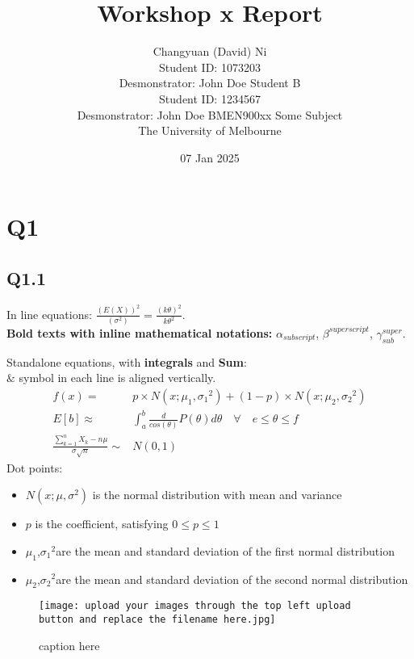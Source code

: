 \documentclass[a4paper,11pt]{article}
\title{Workshop x Report}
\author{\large
Changyuan (David) Ni\\
Student ID: 1073203\\
Desmonstrator: John Doe
\AND
Student B\\
Student ID: 1234567\\
Desmonstrator: John Doe
\AND
\AND
\AND
	BMEN900xx Some Subject\\
\AND
	The University of Melbourne\\
}
\date{07 Jan 2025}
\begin{document}
\maketitle

\newpage
\tableofcontents
\thispagestyle{empty}


\newpage
\setcounter{page}{1}





\newpage





\newpage
\section{Q1}
\subsection{Q1.1}
In line equations:  $\frac{(E(X))^2}{(\sigma^2)} = \frac{(k\theta)^2}{k\theta^2}$.\\
\textbf{Bold texts with inline mathematical notations:} $\alpha_{subscript}$, $\beta^{superscript}$, $\gamma_{sub}^{super}$.

Standalone equations, with \textbf{integrals} and \textbf{Sum}:\\
$\&$ symbol in each line is aligned vertically.
\begin{equation}
    \begin{aligned}
        f(x) =& p\times N(x;\mu_1,{\sigma_1}^2) + (1-p)\times N(x;\mu_2,{\sigma_2}^2)\\
        E[b]  \approx& \int_{a}^{b} \frac{d}{cos(\theta)} P(\theta) d\theta \quad \forall \quad  e \le \theta \le f\\
        \frac{\sum_{k=1}^{n}X_k - n\mu}{\sigma \sqrt{n}} \sim& N(0,1)
    \end{aligned}
\end{equation}
Dot points:
\begin{itemize}
    \item $N(x;\mu,{\sigma}^2)$ is the normal distribution with mean and variance
    \item $p$ is the coefficient, satisfying $0\le p \le1$
    \item $\mu_1$,${\sigma_1}^2$are the mean and standard deviation of the first normal distribution
    \item $\mu_2$,${\sigma_2}^2$are the mean and standard deviation of the second normal distribution
\end{itemize}
\newpage
\begin{figure}[H]
    \centering
    \texttt{[image: upload your images through the top left upload button and replace the filename here.jpg]}
    \caption{caption here}
    \label{fig:my_label}
\end{figure}
\end{document}
